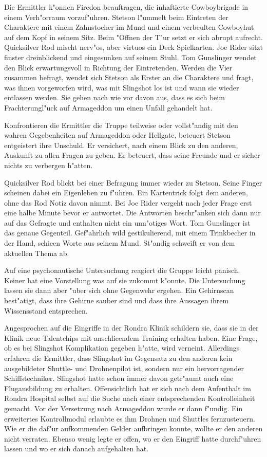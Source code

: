 
Die Ermittler k"onnen Firedon beauftragen, die inhaftierte Cowboybrigade in einem Verh"orraum vorzuf"uhren. Stetson l"ummelt beim Eintreten der Charaktere mit einem Zahnstocher im Mund und einem verbeulten Cowboyhut auf dem Kopf in seinem Sitz. Beim "Offnen der T"ur setzt er sich abrupt aufrecht. Quicksilver Rod mischt nerv"os, aber virtuos ein Deck Spielkarten. Joe Rider sitzt finster dreinblickend und eingesunken auf seinem Stuhl. Tom Gunslinger wendet den Blick erwartungsvoll in Richtung der Eintretenden. Werden die Vier zusammen befragt, wendet sich Stetson als Erster an die Charaktere und fragt, was ihnen vorgeworfen wird, was mit Slingshot los ist und wann sie wieder entlassen werden. Sie gehen nach wie vor davon aus, dass es sich beim Frachterungl"uck auf Armageddon um einen Unfall gehandelt hat.

Konfrontieren die Ermittler die Truppe teilweise oder vollst"andig mit den wahren Gegebenheiten auf Armageddon oder Hellgate, beteuert Stetson entgeistert ihre Unschuld. Er versichert, nach einem Blick zu den anderen, Auskunft zu allen Fragen zu geben. Er beteuert, dass seine Freunde und er sicher nichts zu verbergen h"atten.

Quicksilver Rod blickt bei einer Befragung immer wieder zu Stetson. Seine Finger scheinen dabei ein Eigenleben zu f"uhren. Ein Kartentrick folgt dem anderen, ohne das Rod Notiz davon nimmt. Bei Joe Rider vergeht nach jeder Frage erst eine halbe Minute bevor er antwortet. Die Antworten beschr"anken sich dann nur auf das Gefragte und enthalten nicht ein unn"otiges Wort. Tom Gunslinger ist das genaue Gegenteil. Gef"ahrlich wild gestikulierend, mit einem Trinkbecher in der Hand, schie\3en Worte aus seinem Mund. St"andig schweift er von dem aktuellen Thema ab.

Auf eine psychonautische Untersuchung reagiert die Gruppe leicht panisch. Keiner hat eine Vorstellung was auf sie zukommt k"onnte. Die Untersuchung lassen sie dann aber "uber sich ohne Gegenwehr ergehen. Ein Gehirnscan best"atigt, dass ihre Gehirne sauber sind und dass ihre Aussagen ihrem Wissensstand entsprechen. 

Angesprochen auf die Eingriffe in der Rondra Klinik schildern sie, dass sie in der Klinik neue Talentchips mit anschlie\3endem Training erhalten haben. Eine Frage, ob es bei Slingshot Komplikation gegeben h"atte, wird verneint. Allerdings erfahren die Ermittler, dass Slingshot im Gegensatz zu den anderen kein ausgebildeter Shuttle- und Drohnenpilot ist, sondern nur ein hervorragender Schiffstechniker. Slingshot hatte schon immer davon getr"aumt auch eine Flugausbildung zu erhalten. Offensichtlich hat er sich nach dem Aufenthalt im Rondra Hospital selbst auf die Suche nach einer entsprechenden Kontrolleinheit gemacht. Vor der Versetzung nach Armageddon wurde er dann f"undig. 
Ein erweitertes Kontrollmodul erlaubte es ihm Drohnen und Shuttles fernzusteuern. Wie er die daf"ur aufkommenden Gelder aufbringen konnte, wollte er den anderen nicht verraten. Ebenso wenig legte er offen, wo er den Eingriff hatte durchf"uhren lassen und wo er sich danach aufgehalten hat. 

